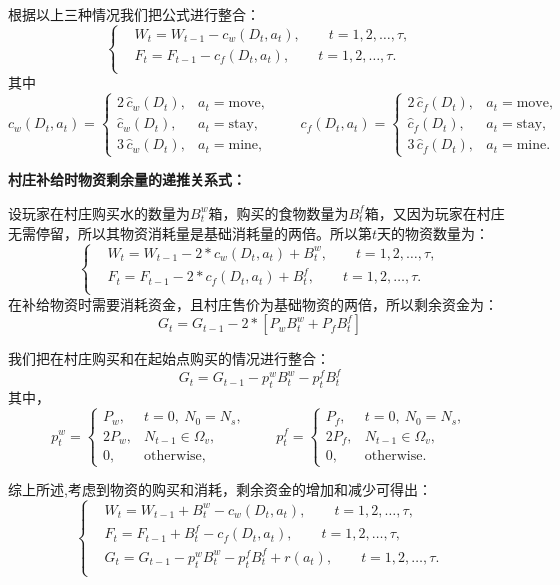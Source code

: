 根据以上三种情况我们把公式进行整合：
\[
\left\{
\begin{aligned}
&W_t=W_{t-1}-c_w(D_t,a_t), \qquad t=1,2,\dots,\tau, \\[1mm]
&F_t=F_{t-1}-c_f(D_t,a_t), \qquad t=1,2,\dots,\tau. \\[1mm]
\end{aligned}
\right.
\]
其中
\[
c_w(D_t,a_t)=
\begin{cases}
2\,\hat c_w(D_t), & a_t=\text{move},\\
\hat c_w(D_t), & a_t=\text{stay},\\
3\,\hat c_w(D_t), & a_t=\text{mine},
\end{cases}
\qquad
c_f(D_t,a_t)=
\begin{cases}
2\,\hat c_f(D_t), & a_t=\text{move},\\
\hat c_f(D_t), & a_t=\text{stay},\\
3\,\hat c_f(D_t), & a_t=\text{mine}.
\end{cases}
\]

 \textbf{村庄补给时物资剩余量的递推关系式：}

设玩家在村庄购买水的数量为$B_t^w$箱，购买的食物数量为$B_t^f$箱，又因为玩家在村庄无需停留，所以其物资消耗量是基础消耗量的两倍。所以第$t$天的物资数量为：
\[
\left\{
\begin{aligned}
&W_t=W_{t-1}-2*c_w(D_t,a_t)+B_t^w, \qquad t=1,2,\dots,\tau, \\[1mm]
&F_t=F_{t-1}-2*c_f(D_t,a_t)+B_t^f, \qquad t=1,2,\dots,\tau. \\[1mm]
\end{aligned}
\right.
\]
在补给物资时需要消耗资金，且村庄售价为基础物资的两倍，所以剩余资金为：
\[G_t = G_{t - 1} - 2*[P_wB_t^w+P_fB_t^f] \]

我们把在村庄购买和在起始点购买的情况进行整合：
\[
G_t=G_{t-1}-p_t^wB_t^w-p_t^fB_t^f
\]
其中，
\[
p_t^w=
\begin{cases}
P_w, & t=0,\ N_0=N_s,\\
2P_w, & N_{t-1}\in\Omega_v,\\
0, & \text{otherwise},
\end{cases}
\qquad
p_t^f=
\begin{cases}
P_f, & t=0,\ N_0=N_s,\\
2P_f, & N_{t-1}\in\Omega_v,\\
0, & \text{otherwise}.
\end{cases}
\]

综上所述,考虑到物资的购买和消耗，剩余资金的增加和减少可得出：
\[
\left\{
\begin{aligned}
&W_t=W_{t-1}+B_t^w-c_w(D_t,a_t), \qquad t=1,2,\dots,\tau,\\[1mm]
&F_t=F_{t-1}+B_t^f-c_f(D_t,a_t), \qquad t=1,2,\dots,\tau,\\[1mm]
&G_t=G_{t-1}-p_t^wB_t^w-p_t^fB_t^f+r(a_t), \qquad t=1,2,\dots,\tau.\\[1mm]
\end{aligned}
\right.
\]

